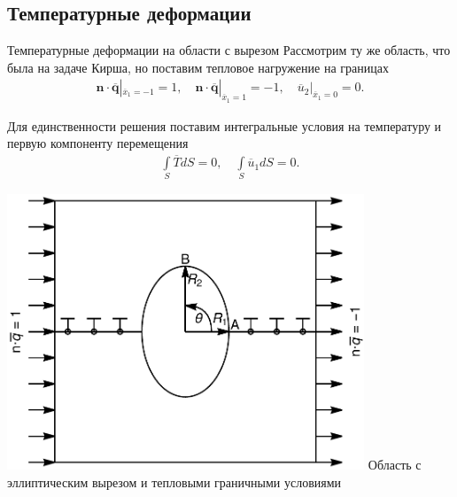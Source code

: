 \subsection{Температурные деформации}
\begin{frame}{Температурные деформации на области с вырезом}
	Рассмотрим ту же область, что была на задаче Кирша, но поставим тепловое нагружение на границах
\begin{gather*}
	\boldsymbol{n} \cdot \overline{\boldsymbol{q}}|_{\overline{x}_1 = -1} = 1,
	\quad
	\boldsymbol{n} \cdot \overline{\boldsymbol{q}}|_{\overline{x}_1 = 1} = -1,
	\quad
	\overline{u}_2 |_{\overline{x}_1 = 0} = 0.
\end{gather*}
\begin{minipage}{0.49\textwidth}
	Для единственности решения поставим интегральные условия на температуру и первую компоненту перемещения
	\begin{gather*}
		\int\limits_S \overline{T} dS = 0,
		\quad
		\int\limits_S \overline{u}_1 dS = 0.
	\end{gather*}
\end{minipage}
\begin{minipage}{0.49\textwidth}
	\centering
	\includegraphics[width=0.8\textwidth]{pics/EllipseThermal.pdf}
	Область с эллиптическим вырезом и тепловыми граничными условиями
\end{minipage}
\end{frame}


